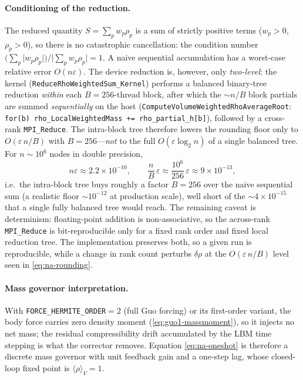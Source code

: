 \documentclass[11pt]{article}
\theoremstyle{definition}
\theoremstyle{remark}
\begin{document}
\paragraph{Conditioning of the reduction.}
The reduced quantity $S=\sum_p w_p\rho_p$ is a sum of strictly positive terms
($w_p>0$, $\rho_p>0$), so there is no catastrophic cancellation: the condition
number $\bigl(\sum_p\lvert w_p\rho_p\rvert\bigr)/\lvert\sum_p w_p\rho_p\rvert=1$.
A naive sequential accumulation has a worst-case relative error $O(n\varepsilon)$.
The device reduction is, however, only \emph{two-level}: the kernel
(\texttt{ReduceRhoWeightedSum\_Kernel}) performs a balanced binary-tree reduction
\emph{within} each $B{=}256$-thread block, after which the $\sim n/B$ block partials
are summed \emph{sequentially} on the host
(\texttt{ComputeVolumeWeightedRhoAverageRoot}:
\texttt{for(b) rho\_LocalWeightedMass += rho\_partial\_h[b]}), followed by a
cross-rank \texttt{MPI\_Reduce}. The intra-block tree therefore lowers the rounding
floor only to $O(\varepsilon\,n/B)$ with $B{=}256$---\emph{not} to the full
$O(\varepsilon\log_2 n)$ of a single balanced tree. For $n\sim10^6$ nodes in double
precision,
\begin{equation}
  n\varepsilon \approx 2.2\times10^{-10},
  \qquad
  \frac{n}{B}\,\varepsilon \approx \frac{10^{6}}{256}\,\varepsilon \approx 9\times10^{-13},
  \label{eq:na-rounding}
\end{equation}
i.e.\ the intra-block tree buys roughly a factor $B=256$ over the naive sequential
sum (a realistic floor $\sim\!10^{-12}$ at production scale), well short of the
$\sim\!4\times10^{-15}$ that a single fully balanced tree would reach. The remaining
caveat is determinism: floating-point addition is non-associative, so the
across-rank \texttt{MPI\_Reduce} is bit-reproducible only for a fixed rank order
and fixed local reduction tree. The implementation preserves both, so a given run
is reproducible, while a change in rank count perturbs $\delta\rho$ at the
$O(\varepsilon\,n/B)$ level seen in \eqref{eq:na-rounding}.

\paragraph{Mass governor interpretation.}
With \texttt{FORCE\_HERMITE\_ORDER}${=}2$ (full Guo forcing) or its first-order
variant, the body force carries zero density moment (\eqref{eq:guo1-massmoment}),
so it injects no net mass; the residual compressibility drift accumulated by the
LBM time stepping is what the corrector removes. Equation \eqref{eq:na-oneshot} is
therefore a discrete mass governor with unit feedback gain and a one-step lag,
whose closed-loop fixed point is $\langle\rho\rangle_V=1$.
\end{document}
